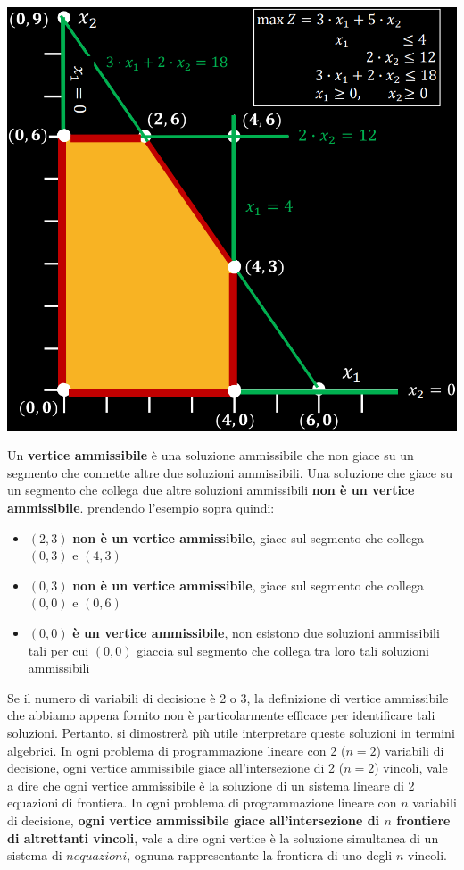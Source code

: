 \documentclass[12pt]{article}
\begin{document}
\begin{center}
    \includegraphics[width = 0.60\linewidth]{Images/35.png}
\end{center}
Un \textbf{vertice ammissibile} è una soluzione ammissibile che non giace su un segmento che connette altre due soluzioni ammissibili.
Una soluzione che giace su un segmento che collega due altre soluzioni ammissibili \textbf{non è un vertice ammissibile}. prendendo l'esempio sopra quindi:
\begin{itemize}
    \item $(2,3)$ \textbf{non è un vertice ammissibile}, giace sul segmento che collega $(0,3)$ e $(4,3)$
    \item $(0,3)$ \textbf{non è un vertice ammissibile}, giace sul segmento che collega $(0,0)$ e $(0,6)$
    \item $(0,0)$ \textbf{è un vertice ammissibile}, non esistono due soluzioni ammissibili tali per cui $(0,0)$ giaccia sul segmento che collega tra loro tali soluzioni ammissibili
\end{itemize}
Se il numero di variabili di decisione è 2 o 3, la definizione di vertice ammissibile che abbiamo appena fornito non è particolarmente efficace per identificare tali soluzioni.
Pertanto, si dimostrerà più utile interpretare queste soluzioni in termini algebrici. In ogni problema di programmazione lineare con 2 ($n = 2$) variabili di decisione, ogni vertice ammissibile giace all'intersezione
di 2 ($n = 2$) vincoli, vale a dire che ogni vertice ammissibile è la soluzione di un sistema lineare di 2 equazioni di frontiera.
In ogni problema di programmazione lineare con $n$ variabili di decisione, \textbf{ogni vertice ammissibile giace all'intersezione di $n$ frontiere di altrettanti vincoli}, vale a dire ogni vertice è la soluzione simultanea
di un sistema di \textbf{$n equazioni$}, ognuna rappresentante la frontiera di uno degli $n$ vincoli.
\end{document}
